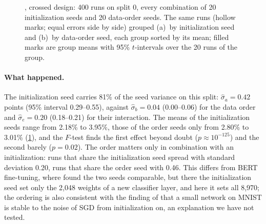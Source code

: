 \begin{refsection}
\begin{figure}[t]
\begin{fullwidth}
\centering
{}
\caption{, crossed design: 400 runs on split 0, every combination of 20 initialization seeds and 20 data-order seeds. The same runs (hollow marks; equal errors side by side) grouped (a)~by initialization seed and (b)~by data-order seed, each group sorted by its mean; filled marks are group means with 95\% $t$-intervals over the 20 runs of the group.}
\label{fig:seeds:components}
\end{fullwidth}
\end{figure}

\paragraph{What happened.} The initialization seed carries 81\% of the seed variance on this split: $\hat\sigma_a=0.42$ points (95\% interval 0.29--0.55), against $\hat\sigma_b=0.04$ (0.00--0.06) for the data order and $\hat\sigma_e=0.20$ (0.18--0.21) for their interaction. The means of the initialization seeds range from 2.18\% to 3.95\%, those of the order seeds only from 2.80\% to 3.01\% (\cref{fig:seeds:components}), and the $F$-test finds the first effect beyond doubt ($p\approx10^{-125}$) and the second barely ($p=0.02$). The order matters only in combination with an initialization: runs that share the initialization seed spread with standard deviation 0.20, runs that share the order seed with 0.46. This differs from BERT fine-tuning, where \textcite{DodgeEtAl2020} found the two seeds comparable, but there the initialization seed set only the 2,048 weights of a new classifier layer, and here it sets all 8,970; the ordering is also consistent with the finding of \textcite{FrankleEtAl2020} that a small network on MNIST is stable to the noise of SGD from initialization on, an explanation we have not tested.


\end{refsection}
